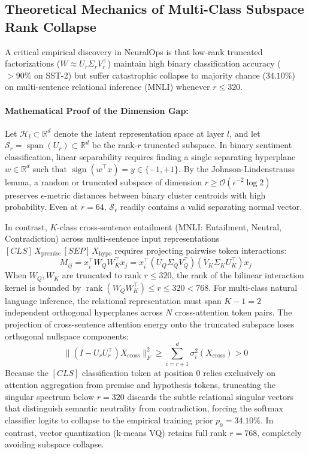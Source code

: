 \documentclass{article}
\begin{document}
\subsection{Theoretical Mechanics of Multi-Class Subspace Rank Collapse}
\label{app:rank_collapse_mechanics}
A critical empirical discovery in NeuralOps is that low-rank truncated factorizations ($W \approx U_r \Sigma_r V_r^\top$) maintain high binary classification accuracy ($>90\%$ on SST-2) but suffer catastrophic collapse to majority chance ($34.10\%$) on multi-sentence relational inference (MNLI) whenever $r \le 320$.

\paragraph{Mathematical Proof of the Dimension Gap:}
Let $\mathcal{H}_l \subset \mathbb{R}^d$ denote the latent representation space at layer $l$, and let $\mathcal{S}_r = \operatorname{span}(U_r) \subset \mathbb{R}^d$ be the rank-$r$ truncated subspace. 
In binary sentiment classification, linear separability requires finding a single separating hyperplane $w \in \mathbb{R}^d$ such that $\operatorname{sign}(w^\top x) = y \in \{-1, +1\}$. By the Johnson-Lindenstrauss lemma, a random or truncated subspace of dimension $r \ge \mathcal{O}(\epsilon^{-2} \log 2)$ preserves $\epsilon$-metric distances between binary cluster centroids with high probability. Even at $r=64$, $\mathcal{S}_r$ readily contains a valid separating normal vector.

In contrast, $K$-class cross-sentence entailment (MNLI: Entailment, Neutral, Contradiction) across multi-sentence input representations $[CLS] \, X_{\text{premise}} \, [SEP] \, X_{\text{hypo}}$ requires projecting pairwise token interactions:
\begin{equation}
    M_{ij} = x_i^\top W_Q W_K^\top x_j = x_i^\top (U_Q \Sigma_Q V_Q^\top) (V_K \Sigma_K U_K^\top) x_j
\end{equation}
When $W_Q, W_K$ are truncated to rank $r \le 320$, the rank of the bilinear interaction kernel is bounded by $\operatorname{rank}(W_Q W_K^\top) \le r \le 320 < 768$. For multi-class natural language inference, the relational representation must span $K-1=2$ independent orthogonal hyperplanes across $N$ cross-attention token pairs. The projection of cross-sentence attention energy onto the truncated subspace loses orthogonal nullspace components:
\begin{equation}
    \| (I - U_r U_r^\top) X_{\text{cross}} \|_F^2 \ge \sum_{i=r+1}^d \sigma_i^2(X_{\text{cross}}) > 0
\end{equation}
Because the $[CLS]$ classification token at position 0 relies exclusively on attention aggregation from premise and hypothesis tokens, truncating the singular spectrum below $r=320$ discards the subtle relational singular vectors that distinguish semantic neutrality from contradiction, forcing the softmax classifier logits to collapse to the empirical training prior $p_0 = 34.10\%$. In contrast, vector quantization (k-means VQ) retains full rank $r=768$, completely avoiding subspace collapse.
\end{document}
